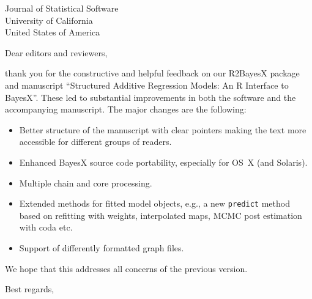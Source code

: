 \documentclass[american]{uibkletter}
\let\proglang=\textsf
\newcommand{\pkg}[1]{{\fontseries{b}\selectfont #1}}
\begin{document}
\begin{letter}{
Journal of Statistical Software \\
University of California \\
United States of America}


\opening{Dear editors and reviewers,}

thank you for the constructive and helpful feedback on our \pkg{R2BayesX} package and manuscript
``Structured Additive Regression Models: An \proglang{R} Interface to \pkg{BayesX}''. These led to
substantial improvements in both the software and the accompanying manuscript. The major changes
are the following:
\begin{itemize}
\item Better structure of the manuscript with clear pointers making the text more accessible for different groups of readers.
\item Enhanced \pkg{BayesX} source code portability, especially for OS~X (and Solaris).
\item Multiple chain and core processing.
\item Extended methods for fitted model objects, e.g., a new \texttt{predict} method based on refitting
  with weights, interpolated maps, MCMC post estimation with \pkg{coda} etc.
\item Support of differently formatted graph files.
\end{itemize}
We hope that this addresses all concerns of the previous version.
  
\closing{Best regards,}
\end{letter}


\end{document}
